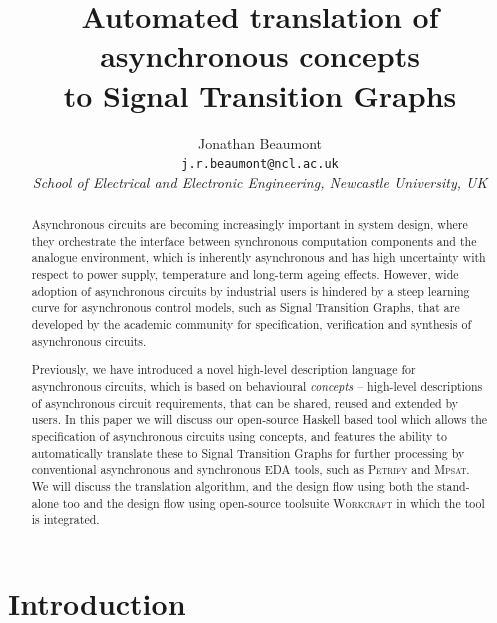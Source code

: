 \documentclass[british,conference,compsoc]{IEEEtran}
\newcommand{\noun}[1]{\textsc{#1}}
\begin{document}
\twocolumn

\title{Automated translation of asynchronous concepts \\
to Signal Transition Graphs}
\author{Jonathan Beaumont\\
\texttt{j.r.beaumont@ncl.ac.uk}\\
\emph{School of Electrical and Electronic Engineering, Newcastle University,
UK}}

\maketitle

\begin{abstract}
Asynchronous circuits are becoming increasingly important in
system design, where they orchestrate
the interface between synchronous computation components
and the analogue environment, which is inherently asynchronous
and has high uncertainty with respect to power supply,
temperature and long-term ageing effects.
However, wide adoption of asynchronous circuits by industrial users is
hindered by a steep learning curve for asynchronous control models,
such as Signal Transition Graphs, that are developed by the academic
community for specification, verification and synthesis of
asynchronous circuits.

Previously, we have introduced a novel high-level description language
for asynchronous circuits, which is based on behavioural
\textit{concepts} -- high-level descriptions of asynchronous circuit
requirements, that can be shared, reused and extended by users. 
In this paper we will discuss our open-source Haskell based tool which
allows the specification of asynchronous circuits using concepts, and features
the ability to automatically translate these to Signal Transition Graphs for further processing
by conventional asynchronous and synchronous EDA tools, such as \noun{Petrify}
and \noun{Mpsat}. We will discuss the translation algorithm, and the design flow using 
both the stand-alone too and the design flow using open-source toolsuite \noun{Workcraft}
in which the tool is integrated.
\end{abstract}

\sloppy
\thispagestyle{empty}


\section{Introduction}

\vspace{-3mm}
\end{document}
